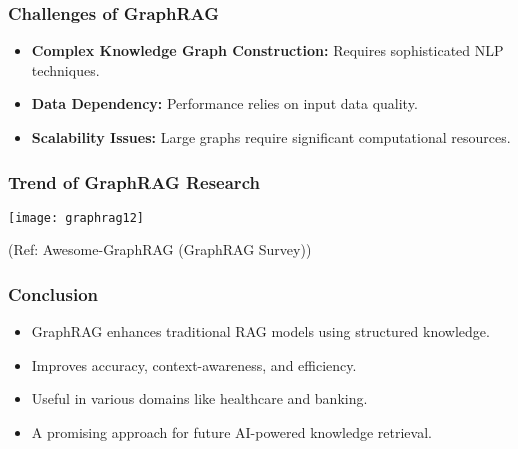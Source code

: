 \begin{frame}[fragile]\frametitle{Challenges of GraphRAG}
    \begin{itemize}
        \item \textbf{Complex Knowledge Graph Construction:} Requires sophisticated NLP techniques.
        \item \textbf{Data Dependency:} Performance relies on input data quality.
        \item \textbf{Scalability Issues:} Large graphs require significant computational resources.
    \end{itemize}
\end{frame}

\begin{frame}[fragile]\frametitle{Trend of GraphRAG Research}

	\begin{center}
	\texttt{[image: graphrag12]}
	\end{center}
	
		{\tiny (Ref: Awesome-GraphRAG (GraphRAG Survey))}

	
\end{frame}

\begin{frame}[fragile]\frametitle{Conclusion}
    \begin{itemize}
        \item GraphRAG enhances traditional RAG models using structured knowledge.
        \item Improves accuracy, context-awareness, and efficiency.
        \item Useful in various domains like healthcare and banking.
        \item A promising approach for future AI-powered knowledge retrieval.
    \end{itemize}
\end{frame}
